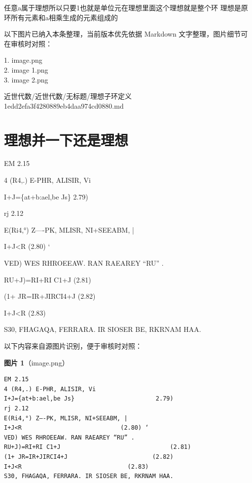 \begin{definition}[理想子环定义]

任意a属于理想所以只要1也就是单位元在理想里面这个理想就是整个环 理想是原环所有元素和a相乘生成的元素组成的

\end{definition}

\begin{note}[关联图片]
以下图片已纳入本条整理，当前版本优先依据 Markdown 文字整理，图片细节可在审核时对照：

1. image.png\\
2. image 1.png\\
3. image 2.png\\

\end{note}

\begin{note}[来源路径]

近世代数/近世代数/无标题/理想子环定义 1edd2efa3f4280889eb4daa974cd0880.md

\end{note}

\section*{理想并一下还是理想}

\begin{note}[理想并一下还是理想]

EM 2.15

4 (R4,.) E-PHR, ALISIR, Vi

I+J=\{at+b:ael,be Js\}                       2.79)

rj 2.12

E(Ri4,°) Z—-PK, MLISR, NI+SEEABM, |

I+J<R                            (2.80) ‘

VED) WES RHROEEAW. RAN RAEAREY “RU” .

RU+J)=RI+RI C1+J                               (2.81)

(1+ JR=IR+JIRCI4+J                        (2.82)

I+J<R                              (2.83)

S30, FHAGAQA, FERRARA. IR SIOSER BE, RKRNAM HAA.

\end{note}

\begin{note}
以下内容来自源图片识别，便于审核时对照：

\textbf{图片 1}（image.png）
\begin{Verbatim}[fontsize=\small]
EM 2.15
4 (R4,.) E-PHR, ALISIR, Vi
I+J={at+b:ael,be Js}                       2.79)
rj 2.12
E(Ri4,°) Z—-PK, MLISR, NI+SEEABM, |
I+J<R                            (2.80) ‘
VED) WES RHROEEAW. RAN RAEAREY “RU” .
RU+J)=RI+RI C1+J                               (2.81)
(1+ JR=IR+JIRCI4+J                        (2.82)
I+J<R                              (2.83)
S30, FHAGAQA, FERRARA. IR SIOSER BE, RKRNAM HAA.
\end{Verbatim}

\end{note}

